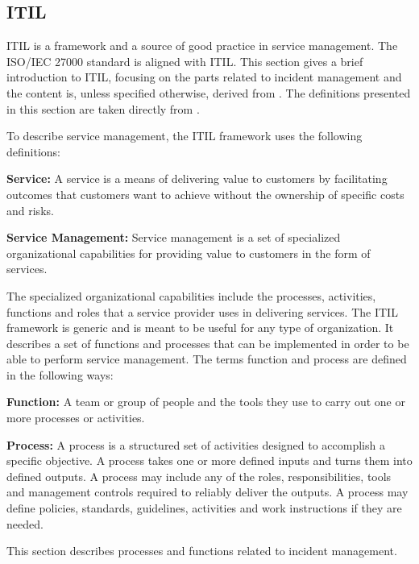 \subsection{ITIL}
\label{section:ITIL}
\ac{ITIL} is a framework and a source of good practice in service management. The \acs{ISO}/\acs{IEC} 27000 standard is aligned with \ac{ITIL}. This section gives a brief introduction to \ac{ITIL}, focusing on the parts related to incident management and the content is, unless specified otherwise, derived from \cite{itilbok}. The definitions presented in this section are taken directly from \cite{itilbok}.

To describe service management, the \ac{ITIL} framework uses the following definitions:

\textbf{Service:} A service is a means of delivering value to customers by facilitating outcomes that customers want to achieve without the ownership of specific costs and risks.

\textbf{Service Management:} Service management is a set of specialized organizational capabilities for providing value to customers in the form of services.

The specialized organizational capabilities include the processes, activities, functions and roles that a service provider uses in delivering services. The \ac{ITIL} framework is generic and is meant to be useful for any type of organization. It describes a set of functions and processes that can be implemented in order to be able to perform service management. The terms function and process are defined in the following ways:

\textbf{Function:} A team or group of people and the tools they use to carry out one or more processes or activities.

\textbf{Process:} A process is a structured set of activities designed to accomplish a specific objective. A process takes one or more defined inputs and turns them into defined outputs. A process may include any of the roles, responsibilities, tools and management controls required to reliably deliver the outputs. A process may define policies, standards, guidelines, activities and work instructions if they are needed.


This section describes processes and functions related to incident management.


